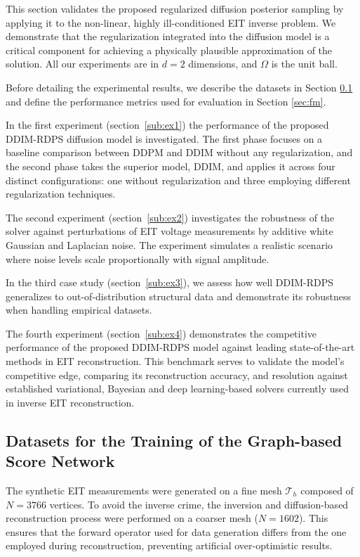 \documentclass[a4paper,11pt]{article}
\def\Tau{\mathscr{T}}
\theoremstyle{definition}
\theoremstyle{plain}
\theoremstyle{remark}
\begin{document}
This section validates the proposed regularized diffusion posterior sampling by applying it to the non-linear, highly ill-conditioned EIT inverse problem. We demonstrate that the regularization integrated into the diffusion model is a critical component for achieving a physically plausible approximation of the solution. All our experiments are in $d=2$ dimensions, and $\Omega$ is the unit ball.

Before detailing the experimental results, we describe the datasets in Section \ref{sec:dataset} and define the performance metrics used for evaluation in Section \ref{sec:fm}.


In the first experiment (section~\ref{sub:ex1})  the performance of the proposed DDIM-RDPS diffusion model is investigated. The first phase focuses on a baseline comparison between DDPM and DDIM without any regularization, and the second phase takes the superior model, DDIM, and applies it across four distinct configurations: one without regularization and three employing different regularization techniques.

The second experiment (section~\ref{sub:ex2}) investigates the robustness of the solver against perturbations of EIT voltage measurements by additive white Gaussian and Laplacian noise. 
The experiment simulates a realistic scenario where noise levels scale proportionally with signal amplitude.

In the third case study (section~\ref{sub:ex3}), we assess how well DDIM-RDPS generalizes to out-of-distribution structural data and demonstrate its robustness when handling empirical datasets. 

The fourth experiment (section~\ref{sub:ex4}) demonstrates the competitive performance of the proposed DDIM-RDPS model against leading state-of-the-art methods in EIT reconstruction. This benchmark serves to validate the model's competitive edge, comparing its reconstruction accuracy, and resolution against established variational, Bayesian and deep learning-based solvers currently used in inverse EIT reconstruction.



\subsection{Datasets for the Training of the Graph-based Score Network}
\label{sec:dataset}

The synthetic EIT measurements were generated on a fine mesh $\Tau_h$ composed of $N = 3766$ vertices.
To avoid the inverse crime, the inversion and diffusion-based reconstruction process 
were performed on a coarser mesh ($N = 1602$).
This ensures that the forward operator used for data generation
differs from the one employed during reconstruction,
preventing artificial over-optimistic results.
\end{document}

